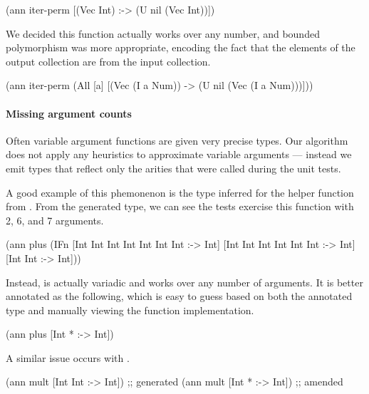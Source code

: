 \begin{cljlisting}
(ann iter-perm [(Vec Int) :-> (U nil (Vec Int))])
\end{cljlisting}

We decided this function actually works over any number,
and bounded polymorphism was more appropriate, encoding
the fact that the elements of the output collection
are from the input collection.

\begin{cljlisting}
(ann iter-perm
  (All [a]
    [(Vec (I a Num)) -> (U nil (Vec (I a Num)))]))
\end{cljlisting}
%

\paragraph{Missing argument counts}
Often variable argument functions are given very precise types.
Our algorithm does not apply any heuristics to approximate
variable arguments --- instead we emit types that reflect
only the arities that were called during the unit tests.

A good example of this phemonenon is the type inferred
for the  helper function from .
From the generated type, we can see the tests exercise this function with 2, 6,
and 7 arguments.

\begin{cljlisting}
(ann plus
  (IFn [Int Int Int Int Int Int Int :-> Int]
       [Int Int Int Int Int Int :-> Int]
       [Int Int :-> Int]))
\end{cljlisting}

Instead,  is actually variadic and works over any number of arguments.
It is better annotated as the following, which is easy to guess based on
both the annotated type and manually viewing the function implementation.

\begin{cljlisting}
(ann plus [Int * :-> Int])
\end{cljlisting}

A similar issue occurs with .

\begin{cljlisting}
(ann mult [Int Int :-> Int]) ;; generated
(ann mult [Int * :-> Int])   ;; amended
\end{cljlisting}

